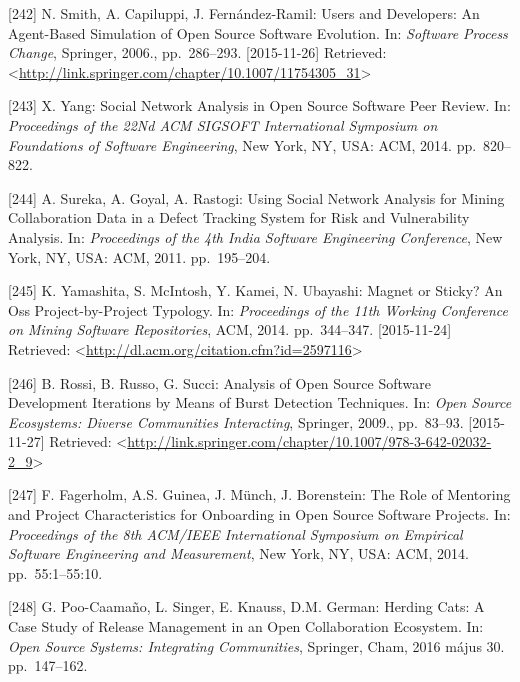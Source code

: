 \documentclass[12pt,magyar,a4paper,oneside]{scrreprt}
\newenvironment{cslreferences}%
  {}%
  {\par}
\begin{document}
\begin{cslreferences}
\leavevmode\hypertarget{ref-smith_users_2006}{}%
{[}242{]} N. Smith, A. Capiluppi, J. Fernández-Ramil: Users and
Developers: An Agent-Based Simulation of Open Source Software Evolution.
In: \emph{Software Process Change}, Springer, 2006., pp.~286--293.
{[}2015-11-26{]} Retrieved:
\textless{}\url{http://link.springer.com/chapter/10.1007/11754305_31}\textgreater{}

\leavevmode\hypertarget{ref-yang_social_2014}{}%
{[}243{]} X. Yang: Social Network Analysis in Open Source Software Peer
Review. In: \emph{Proceedings of the 22Nd ACM SIGSOFT International
Symposium on Foundations of Software Engineering}, New York, NY, USA:
ACM, 2014. pp.~820--822.

\leavevmode\hypertarget{ref-sureka_using_2011}{}%
{[}244{]} A. Sureka, A. Goyal, A. Rastogi: Using Social Network Analysis
for Mining Collaboration Data in a Defect Tracking System for Risk and
Vulnerability Analysis. In: \emph{Proceedings of the 4th India Software
Engineering Conference}, New York, NY, USA: ACM, 2011. pp.~195--204.

\leavevmode\hypertarget{ref-yamashita_magnet_2014}{}%
{[}245{]} K. Yamashita, S. McIntosh, Y. Kamei, N. Ubayashi: Magnet or
Sticky? An Oss Project-by-Project Typology. In: \emph{Proceedings of the
11th Working Conference on Mining Software Repositories}, ACM, 2014.
pp.~344--347. {[}2015-11-24{]} Retrieved:
\textless{}\url{http://dl.acm.org/citation.cfm?id=2597116}\textgreater{}

\leavevmode\hypertarget{ref-rossi_analysis_2009}{}%
{[}246{]} B. Rossi, B. Russo, G. Succi: Analysis of Open Source Software
Development Iterations by Means of Burst Detection Techniques. In:
\emph{Open Source Ecosystems: Diverse Communities Interacting},
Springer, 2009., pp.~83--93. {[}2015-11-27{]} Retrieved:
\textless{}\url{http://link.springer.com/chapter/10.1007/978-3-642-02032-2_9}\textgreater{}

\leavevmode\hypertarget{ref-fagerholm_role_2014}{}%
{[}247{]} F. Fagerholm, A.S. Guinea, J. Münch, J. Borenstein: The Role
of Mentoring and Project Characteristics for Onboarding in Open Source
Software Projects. In: \emph{Proceedings of the 8th ACM/IEEE
International Symposium on Empirical Software Engineering and
Measurement}, New York, NY, USA: ACM, 2014. pp.~55:1--55:10.

\leavevmode\hypertarget{ref-poo-caamano_herding_2016}{}%
{[}248{]} G. Poo-Caamaño, L. Singer, E. Knauss, D.M. German: Herding
Cats: A Case Study of Release Management in an Open Collaboration
Ecosystem. In: \emph{Open Source Systems: Integrating Communities},
Springer, Cham, 2016 május 30. pp.~147--162.


\end{cslreferences}
\end{document}
